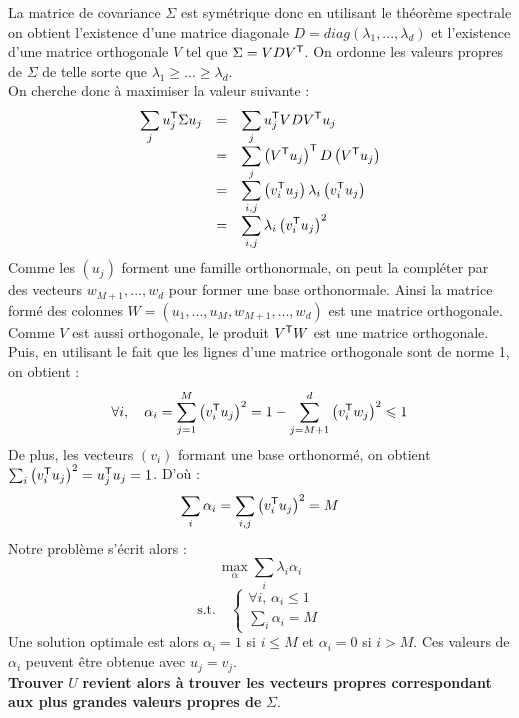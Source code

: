 
La matrice de covariance $\Sigma$ est symétrique donc en utilisant le théorème spectrale on obtient l'existence d'une matrice diagonale $D = diag(\lambda_1, ..., \lambda_d)$ et l'existence d'une matrice orthogonale $V$ tel que $\Sigma = V D V^{\mathsf{T}}$. On ordonne les valeurs propres de $\Sigma$ de telle sorte que $\lambda_1 \geqslant ... \geqslant \lambda_d$. \\
On cherche donc à maximiser la valeur suivante :
$$ \begin{array}{lll}
\displaystyle \sum_j u_j^{\mathsf{T}} \Sigma u_j
& = & \displaystyle \sum_j u_j^{\mathsf{T}} V D V^{\mathsf{T}} u_j \\
& = & \displaystyle \sum_j \left( V^{\mathsf{T}} u_j \right)^{\mathsf{T}} D \left( V^{\mathsf{T}} u_j \right) \\
& = & \displaystyle \sum_{i, j} \left( v_i^{\mathsf{T}} u_j \right) \lambda_i \left( v_i^{\mathsf{T}} u_j \right) \\
& = & \displaystyle \sum_{i, j} \lambda_i \left( v_i^{\mathsf{T}} u_j \right)^2 \\
\end{array} $$
Comme les $(u_j)$ forment une famille orthonormale, on peut la compléter par des vecteurs $w_{M+1}, ..., w_d$ pour former une base orthonormale. Ainsi la matrice formé des colonnes $W = (u_1, ..., u_M, w_{M+1}, ..., w_d)$ est une matrice orthogonale. Comme $V$ est aussi orthogonale, le produit $V^{\mathsf{T}} W$ est une matrice orthogonale. Puis, en utilisant le fait que les lignes d'une matrice orthogonale sont de norme 1, on obtient :
$$ \forall i, \quad \alpha_i = \sum_{j = 1}^M \left( v_i^{\mathsf{T}} u_j \right)^2 = 1 - \sum_{j = M+1}^d \left( v_i^{\mathsf{T}} w_j \right)^2 \leqslant 1 $$
De plus, les vecteurs $(v_i)$ formant une base orthonormé, on obtient $\sum_i \left( v_i^{\mathsf{T}} u_j \right)^2 = u_j^{\mathsf{T}} u_j = 1$. D'où :
$$ \sum_i \alpha_i = \sum_{i, j} \left( v_i^{\mathsf{T}} u_j \right)^2 = M $$
Notre problème s'écrit alors :
$$ \max_\alpha \sum_i \lambda_i \alpha_i $$
\vspace{-2mm}
$$ \text{s.t.} \quad \left\{ \begin{array}{l}
\forall i, \, \alpha_i \leqslant 1 \\
\sum_i \alpha_i = M
\end{array} \right. $$
Une solution optimale est alors $\alpha_i = 1$ si $i \leqslant M$ et $\alpha_i = 0$ si $i > M$. Ces valeurs de $\alpha_i$ peuvent être obtenue avec $u_j = v_j$. \\
{\boldmath \textbf{Trouver} $U$ \textbf{revient alors à trouver les vecteurs propres correspondant aux plus grandes valeurs propres de} $\Sigma$}.

